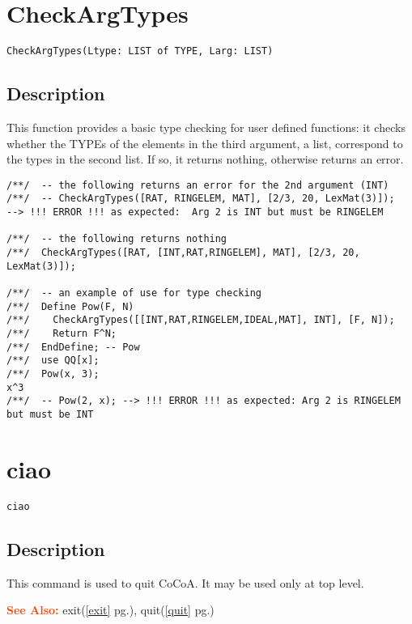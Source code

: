 \documentclass[a4paper]{mybook}
\newenvironment{command}{}{} %
\newcommand\SeeAlso{\par\textcolor{OrangeRed}{\textbf{\large See Also: }}}
\begin{document}
\section{CheckArgTypes}
\label{CheckArgTypes}
\begin{command} %


\begin{Verbatim}[label=syntax, rulecolor=\color{MidnightBlue},
frame=single]
CheckArgTypes(Ltype: LIST of TYPE, Larg: LIST)
\end{Verbatim}


\subsection*{Description}

This function provides a basic type checking for user defined functions:
it checks whether the \textsf{TYPE}s of the elements in the third
argument, a list, correspond to the types in the second list.
If so, it returns nothing, otherwise returns an error.
\begin{Verbatim}[label=example, rulecolor=\color{PineGreen}, frame=single]
/**/  -- the following returns an error for the 2nd argument (INT)
/**/  -- CheckArgTypes([RAT, RINGELEM, MAT], [2/3, 20, LexMat(3)]);
--> !!! ERROR !!! as expected:  Arg 2 is INT but must be RINGELEM

/**/  -- the following returns nothing
/**/  CheckArgTypes([RAT, [INT,RAT,RINGELEM], MAT], [2/3, 20, LexMat(3)]);

/**/  -- an example of use for type checking
/**/  Define Pow(F, N)
/**/    CheckArgTypes([[INT,RAT,RINGELEM,IDEAL,MAT], INT], [F, N]);
/**/    Return F^N;
/**/  EndDefine; -- Pow
/**/  use QQ[x];
/**/  Pow(x, 3);
x^3
/**/  -- Pow(2, x); --> !!! ERROR !!! as expected: Arg 2 is RINGELEM but must be INT
\end{Verbatim}


\end{command} %

\section{ciao}
\label{ciao}
\begin{command} %


\begin{Verbatim}[label=syntax, rulecolor=\color{MidnightBlue},
frame=single]
ciao
\end{Verbatim}


\subsection*{Description}

This command is used to quit CoCoA.  It may be used only at top level.

\SeeAlso %
  exit(\ref{exit} pg.\pageref{exit}), 
    quit(\ref{quit} pg.\pageref{quit})
\end{command} %
\end{document}
